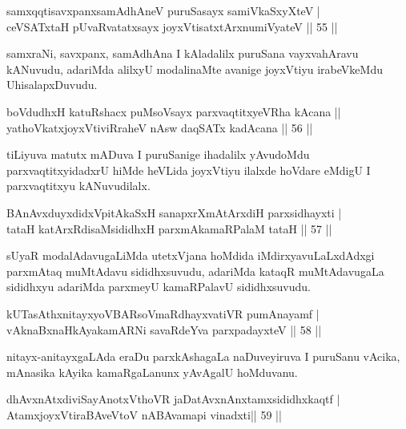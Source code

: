 \begin{shl}
samxqqtisavxpanxsamAdhAneV puruSasayx samiVkaSxyXteV | \\
ceVSATx\s taH pUvaRvatatxsayx joyxVtisatxtArxnumiVyateV \hfill||  55 ||  
\end{shl}

\begin{artha}
samxraNi, savxpanx, samAdhAna I kAladalilx puruSana vayxvahAravu kANuvudu, adariMda alilxyU modalinaMte avanige joyxVtiyu irabeVkeMdu UhisalapxDuvudu.
\end{artha}

\begin{shl}
boVdudhxH katuRshacx puMsoV\s sayx parxvaqtitxyeVRha kAcana ||  \\
yathoVkatxjoyxVtiviRraheV nAsw daqSATx kadAcana \hfill||  56 ||  
\end{shl}

\begin{artha}
tiLiyuva matutx mADuva I puruSanige ihadalilx yAvudoMdu parxvaqtitxyidadxrU hiMde heVLida joyxVtiyu ilalxde hoVdare eMdigU I parxvaqtitxyu kANuvudilalx.
\end{artha}

\begin{shl}
BAnAvxduyxdidxVpitAkaSxH sanapxrXmAtArxdiH parxsidhayxti | \\
tataH katArxRdisaMsididhxH parxmAkamaRPalaM tataH \hfill||  57 ||  
\end{shl}

\begin{artha}
sUyaR modalAdavugaLiMda utetxVjana hoMdida iMdirxyavuLaLxdAdxgi parxmAtaq muMtAdavu sididhxsuvudu, adariMda kataqR muMtAdavugaLa sididhxyu adariMda parxmeyU kamaRPalavU sididhxsuvudu.
\end{artha}

\begin{shl}
kUTasAthxnitayxyoVBARsoVmaRdhayxvatiVR pumAnayamf | \\
vAknaBxnaHkAyakamARNi savaRdeYva parxpadayxteV \hfill||  58 ||  
\end{shl}

\begin{artha}
nitayx-anitayxgaLAda eraDu parxkAshagaLa naDuveyiruva I puruSanu vAcika, mAnasika kAyika kamaRgaLanunx yAvAgalU hoMduvanu.
\end{artha}

\begin{shl}
dhAvxnAtxdiviSayAnotxV\s thoVR jaDatAvxnAnx\s \s tamxsididhxkaqtf | \\
AtamxjoyxVtiraBAveV\s toV nABAvamapi vinadxti\hfill ||  59 ||  
\end{shl}

